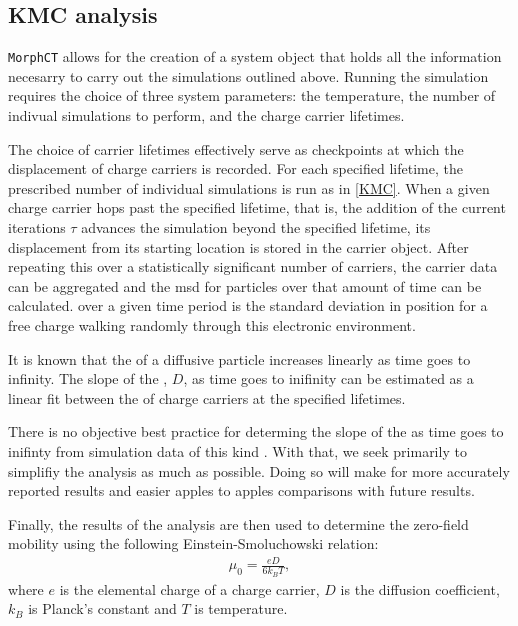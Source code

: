 \subsection{KMC analysis}

\label{kmcanalysis}

\texttt{MorphCT} allows for the creation of a system object that holds all the information necesarry to carry out the
 simulations outlined above. Running the simulation requires the choice of three system parameters: the
 temperature, the number of indivual  simulations to perform, and the charge carrier lifetimes. 

The choice of carrier lifetimes effectively serve as checkpoints at which the displacement of charge carriers is recorded. For
each specified lifetime, the prescribed number of individual  simulations is run as in \autoref{KMC}. When a
given charge carrier hops past the specified lifetime, that is, the addition of the current iterations $\tau$ advances
the simulation beyond the specified lifetime, 
its displacement from its starting location is stored in the carrier object. After repeating this over a
statistically significant number of carriers, the carrier data can be aggregated and the \gls{msd}
for particles over that amount of time can be calculated.  over a given time period is 
the standard deviation in position for a free charge walking randomly through this electronic environment. 

It is known that the  of a diffusive particle increases linearly as time goes to infinity. 
The slope of the , $D$, as time
goes to inifinity can be estimated as a linear fit between the  of charge carriers at the specified lifetimes.

There is no objective best practice for determing the slope of the  as
time goes to inifinty from simulation data of this kind \cite{Maginn2018}. With that, we seek primarily to
simplifiy the  analysis as much as possible. Doing so will make for more accurately reported results and
easier apples to apples comparisons with future results. 

Finally, the results of the  analysis are then used to determine the zero-field mobility using the following Einstein-Smoluchowski relation:
\begin{align}
    \label{einstein}
    \mu_{0} = \frac{eD}{6k_{B}T},
\end{align}
where $e$ is the elemental charge of a charge carrier, $D$ is the diffusion coefficient, $k_{B}$ is Planck's
constant and $T$ is temperature. 

